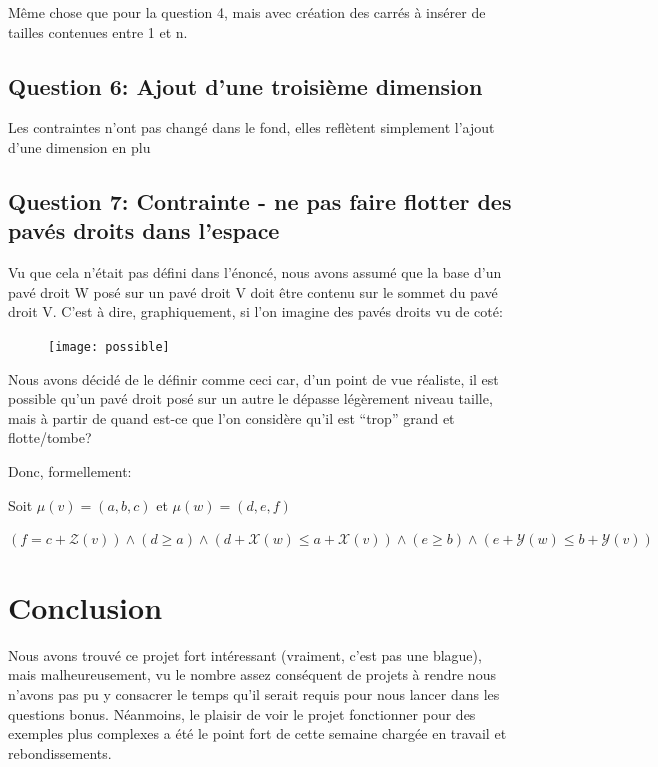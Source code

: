 \documentclass[a4paper,10pt]{article}
\begin{document}
Même chose que pour la question 4, mais avec création des carrés à insérer de tailles contenues entre 1 et n.

\subsection{Question 6: Ajout d'une troisième dimension}

Les contraintes n'ont pas changé dans le fond, elles reflètent simplement l'ajout d'une dimension en plu

\newpage

\subsection{Question 7: Contrainte - ne pas faire flotter des pavés droits dans l'espace}

Vu que cela n'était pas défini dans l'énoncé, nous avons assumé que la base d'un pavé droit W posé sur un pavé droit V doit être contenu sur le sommet du pavé droit V. C'est à dire, graphiquement, si l'on imagine des pavés droits vu de coté:

\begin{figure}[htb!]
\centering
\texttt{[image: possible]}
\end{figure}

Nous avons décidé de le définir comme ceci car, d'un point de vue réaliste, il est possible qu'un pavé droit posé sur un autre le dépasse légèrement niveau taille, mais à partir de quand est-ce que l'on considère qu'il est ``trop'' grand et flotte/tombe?

Donc, formellement: 

Soit $\mu(v) = (a,b,c)$ et $\mu(w) = (d,e,f)$

$(f = c + \mathcal{Z}(v)) \land (d \geq a) \land (d+\mathcal{X}(w) \leq a+\mathcal{X}(v)) \land (e \geq b) \land(e+\mathcal{Y}(w) \leq b+\mathcal{Y}(v))$ 

\section{Conclusion}

Nous avons trouvé ce projet fort intéressant (vraiment, c'est pas une blague), mais malheureusement, vu le nombre assez conséquent de projets à rendre nous n'avons pas pu y consacrer le temps qu'il serait requis pour nous lancer dans les questions bonus. Néanmoins, le plaisir de voir le projet fonctionner pour des exemples plus complexes a été le point fort de cette semaine chargée en travail et rebondissements.
\end{document}
